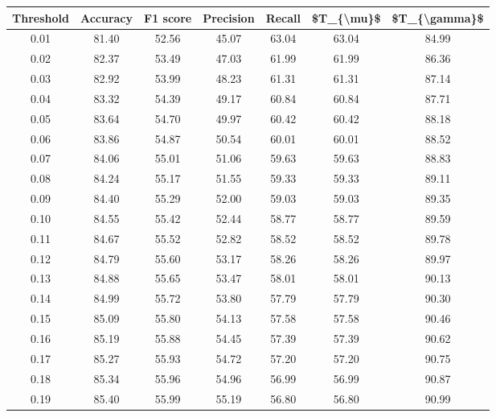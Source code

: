 \begin{tabular}{|c|c|c|c|c|c|c|}
\hline
 Threshold &  Accuracy &  F1 score &  Precision &  Recall &  \$T\_\{\textbackslash mu\}\$ &  \$T\_\{\textbackslash gamma\}\$ \\
\hline
      0.01 &     81.40 &     52.56 &      45.07 &   63.04 &      63.04 &         84.99 \\
      0.02 &     82.37 &     53.49 &      47.03 &   61.99 &      61.99 &         86.36 \\
      0.03 &     82.92 &     53.99 &      48.23 &   61.31 &      61.31 &         87.14 \\
      0.04 &     83.32 &     54.39 &      49.17 &   60.84 &      60.84 &         87.71 \\
      0.05 &     83.64 &     54.70 &      49.97 &   60.42 &      60.42 &         88.18 \\
      0.06 &     83.86 &     54.87 &      50.54 &   60.01 &      60.01 &         88.52 \\
      0.07 &     84.06 &     55.01 &      51.06 &   59.63 &      59.63 &         88.83 \\
      0.08 &     84.24 &     55.17 &      51.55 &   59.33 &      59.33 &         89.11 \\
      0.09 &     84.40 &     55.29 &      52.00 &   59.03 &      59.03 &         89.35 \\
      0.10 &     84.55 &     55.42 &      52.44 &   58.77 &      58.77 &         89.59 \\
      0.11 &     84.67 &     55.52 &      52.82 &   58.52 &      58.52 &         89.78 \\
      0.12 &     84.79 &     55.60 &      53.17 &   58.26 &      58.26 &         89.97 \\
      0.13 &     84.88 &     55.65 &      53.47 &   58.01 &      58.01 &         90.13 \\
      0.14 &     84.99 &     55.72 &      53.80 &   57.79 &      57.79 &         90.30 \\
      0.15 &     85.09 &     55.80 &      54.13 &   57.58 &      57.58 &         90.46 \\
      0.16 &     85.19 &     55.88 &      54.45 &   57.39 &      57.39 &         90.62 \\
      0.17 &     85.27 &     55.93 &      54.72 &   57.20 &      57.20 &         90.75 \\
      0.18 &     85.34 &     55.96 &      54.96 &   56.99 &      56.99 &         90.87 \\
      0.19 &     85.40 &     55.99 &      55.19 &   56.80 &      56.80 &         90.99 \\

\end{tabular}
